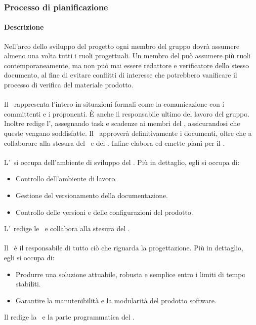 \subsubsection{Processo di pianificazione}
\paragraph{Descrizione}
Nell'arco dello sviluppo del progetto ogni membro del gruppo dovrà assumere almeno una volta tutti i ruoli progettuali.
Un membro del  può assumere più ruoli contemporaneamente, ma non può mai essere redattore e verificatore dello stesso documento, al fine di evitare conflitti di interesse che potrebbero vanificare il processo di verifica del materiale prodotto.

\paragraph{\Pm}
Il \Pm\ rappresenta l'intero  in situazioni formali come la comunicazione con i committenti e i proponenti. È anche il responsabile ultimo del lavoro del gruppo. Inoltre redige l', assegnando task e scadenze ai membri del , assicurandosi che queste vengano soddisfatte. 
Il \Pm\ approverà definitivamente i documenti, oltre che a collaborare alla stesura del \PdP\  e del \PdQ.
Infine elabora ed emette piani per il .

\paragraph{\Am}
L'\Am\ si occupa dell'ambiente di sviluppo del . Più in dettaglio, egli si occupa di:
\begin{itemize}
  \item Controllo dell'ambiente di lavoro.
  \item Gestione del versionamento della documentazione.
  \item Controllo delle versioni e delle configurazioni del prodotto.
\end{itemize}
L'\Am\ redige le \NdP\ e collabora alla stesura del
\PdP.

\paragraph{\Prog} 
Il \Prog\ è il responsabile di tutto ciò che riguarda la progettazione.
Più in dettaglio, egli si occupa di:
\begin{itemize}
  \item Produrre una soluzione attuabile, robusta e semplice entro i limiti di
  tempo stabiliti.
  \item Garantire la manutenibilità e la modularità del prodotto software.
\end{itemize}
Il \Prog redige la \DDP\ e la parte programmatica del \PdQ.

